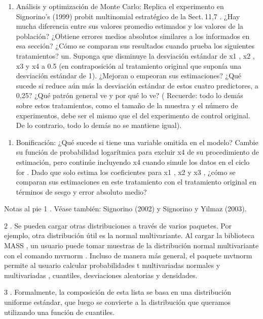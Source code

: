 \documentclass[
]{book}
\providecommand{\tightlist}{%
  \setlength{\itemsep}{0pt}\setlength{\parskip}{0pt}}
\begin{document}
\begin{enumerate}
\def\labelenumi{\arabic{enumi}.}
\setcounter{enumi}{4}
\tightlist
\item
  Análisis y optimización de Monte Carlo: Replica el experimento en Signorino's (1999) probit multinomial estratégico de la Sect. 11,7 . ¿Hay mucha diferencia entre sus valores promedio estimados y los valores de la población? ¿Obtiene errores medios absolutos similares a los informados en esa sección? ¿Cómo se comparan sus resultados cuando prueba los siguientes tratamientos?
  un.
  Suponga que disminuye la desviación estándar de x1 , x2 , x3 y x4 a 0.5 (en contraposición al tratamiento original que suponía una desviación estándar de 1). ¿Mejoran o empeoran sus estimaciones? ¿Qué sucede si reduce aún más la desviación estándar de estos cuatro predictores, a 0,25? ¿Qué patrón general ve y por qué lo ve? ( Recuerde: todo lo demás sobre estos tratamientos, como el tamaño de la muestra y el número de experimentos, debe ser el mismo que el del experimento de control original. De lo contrario, todo lo demás no se mantiene igual).
\end{enumerate}

\begin{enumerate}
\def\labelenumi{\Alph{enumi}.}
\setcounter{enumi}{1}
\tightlist
\item
  Bonificación: ¿Qué sucede si tiene una variable omitida en el modelo? Cambie su función de probabilidad logarítmica para excluir x4 de su procedimiento de estimación, pero continúe incluyendo x4 cuando simule los datos en el ciclo for . Dado que solo estima los coeficientes para x1 , x2 y x3 , ¿cómo se comparan sus estimaciones en este tratamiento con el tratamiento original en términos de sesgo y error absoluto medio?
\end{enumerate}

Notas al pie
1 .
Véase también: Signorino (2002) y Signorino y Yilmaz (2003).

2 .
Se pueden cargar otras distribuciones a través de varios paquetes. Por ejemplo, otra distribución útil es la normal multivariante. Al cargar la biblioteca MASS , un usuario puede tomar muestras de la distribución normal multivariante con el comando mvrnorm . Incluso de manera más general, el paquete mvtnorm permite al usuario calcular probabilidades t multivariadas normales y multivariadas , cuantiles, desviaciones aleatorias y densidades.

3 .
Formalmente, la composición de esta lista se basa en una distribución uniforme estándar, que luego se convierte a la distribución que queramos utilizando una función de cuantiles.
\end{document}
